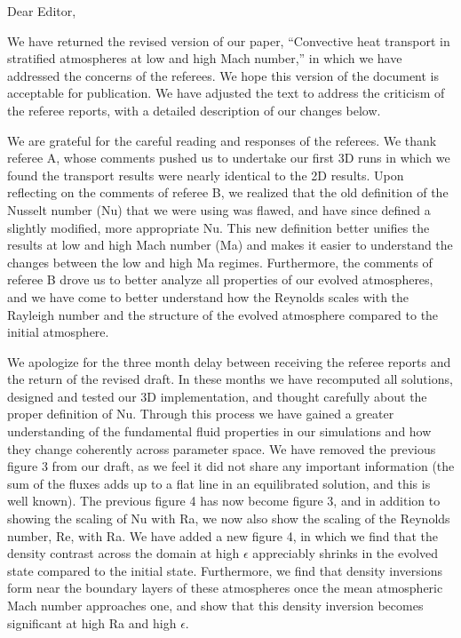 \documentclass[aps, 11pt, singlecolumn]{revtex4-1} %
\begin{document}
\noindent
Dear Editor,
$\,$\newline

\begin{singlespace}
We have returned the revised version of our paper, 
``Convective heat transport in stratified atmospheres at low and high
Mach number,'' in which we have addressed the concerns of the referees.
We hope this version of the document is acceptable for publication.  We
have adjusted the text to address the criticism of the referee reports,
with a detailed description of our changes below.

We are grateful for the careful reading and responses of the referees.  
We thank referee A, whose
comments pushed us to undertake our first 3D runs in which we found the
transport results were nearly identical to the 2D results.
Upon reflecting on the
comments of referee B, we realized that the old definition of the
Nusselt number (Nu) that we were using was flawed, and have since defined
a slightly modified, more appropriate Nu.  This new definition better unifies
the results at low and high Mach number (Ma) and makes it easier to understand
the changes between the low and high Ma regimes.  Furthermore, 
the comments of referee B drove us to better analyze all properties of our evolved
atmospheres, and we have come to better understand how the Reynolds scales with
the Rayleigh number and the structure of the evolved atmosphere compared to the
initial atmosphere.

We apologize for the three month delay between receiving the referee reports
and the return of the revised draft.  In these months we have
recomputed all solutions, designed and tested our 3D implementation, and
thought carefully about the proper definition of Nu.  Through this
process we have gained a greater understanding of the fundamental
fluid properties in our simulations and how they change coherently
across parameter space.  We have removed the previous figure 3 from our
draft, as we feel it did not share any important information (the sum of
the fluxes adds up to a flat line in an equilibrated solution, and this
is well known).  The previous figure 4 has now become figure 3, and in addition
to showing the scaling of Nu with Ra, we now also show the scaling of the
Reynolds number, Re, with Ra.  We have added a new figure 4, in which we
find that the density contrast across the domain at high $\epsilon$ appreciably
shrinks in the evolved state compared to the initial state.  Furthermore, we
find that density inversions form near the boundary layers of these atmospheres
once the mean atmospheric Mach number approaches one, and show that this density
inversion becomes significant at high Ra and high $\epsilon$.


\end{singlespace}
\end{document}
